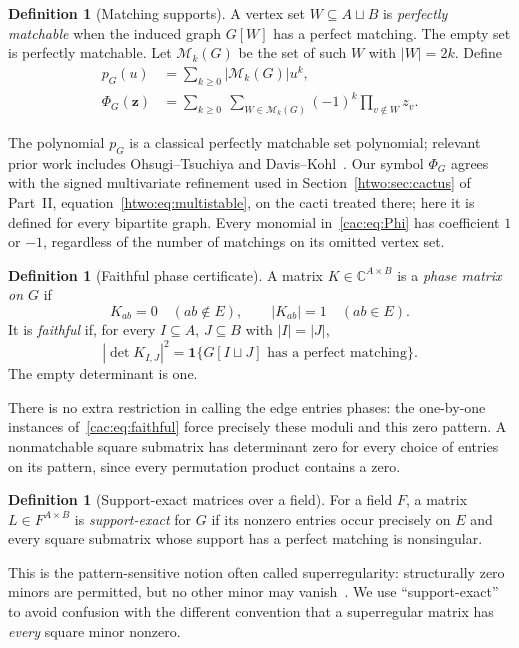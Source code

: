 \documentclass[11pt]{article}
\numberwithin{equation}{section}
\theoremstyle{definition}
\newtheorem{definition}[theorem]{Definition}
\newcommand{\C}{\mathbb C}
\newcommand{\PM}{\mathcal M}
\newcommand{\zv}{\mathbf z}
\newcommand{\normsq}[1]{\left|#1\right|^2}
\begin{document}
\begin{definition}[Matching supports]
A vertex set $W\subseteq A\sqcup B$ is \emph{perfectly matchable} when the induced graph $G[W]$ has a perfect matching. The empty set is perfectly matchable. Let $\PM_k(G)$ be the set of such $W$ with $|W|=2k$. Define
\begin{align}
 p_G(u)&=\sum_{k\geq0}|\PM_k(G)|u^k,\label{cac:eq:p}\\
 \Phi_G(\zv)&=\sum_{k\geq0}\ \sum_{W\in\PM_k(G)}
          (-1)^k\prod_{v\notin W}z_v.\label{cac:eq:Phi}
\end{align}
\end{definition}
The polynomial $p_G$ is a classical perfectly matchable set polynomial; relevant prior work includes Ohsugi--Tsuchiya and Davis--Kohl~\cite{OT21,DK}. Our symbol $\Phi_G$ agrees with the signed multivariate refinement used in Section~\ref{htwo:sec:cactus} of Part~II, equation~\eqref{htwo:eq:multistable}, on the cacti treated there; here it is defined for every bipartite graph. Every monomial in~\eqref{cac:eq:Phi} has coefficient $1$ or $-1$, regardless of the number of matchings on its omitted vertex set.

\begin{definition}[Faithful phase certificate]
A matrix $K\in\C^{A\times B}$ is a \emph{phase matrix on $G$} if
\[
 K_{ab}=0\quad(ab\notin E),\qquad |K_{ab}|=1\quad(ab\in E).
\]
It is \emph{faithful} if, for every $I\subseteq A$, $J\subseteq B$ with $|I|=|J|$,
\begin{equation}
 \normsq{\det K_{I,J}}
 =\mathbf1\{G[I\sqcup J]\text{ has a perfect matching}\}.
 \label{cac:eq:faithful}
\end{equation}
The empty determinant is one.
\end{definition}
There is no extra restriction in calling the edge entries phases: the one-by-one instances of~\eqref{cac:eq:faithful} force precisely these moduli and this zero pattern. A nonmatchable square submatrix has determinant zero for every choice of entries on its pattern, since every permutation product contains a zero.

\begin{definition}[Support-exact matrices over a field]
For a field $F$, a matrix $L\in F^{A\times B}$ is \emph{support-exact} for $G$ if its nonzero entries occur precisely on $E$ and every square submatrix whose support has a perfect matching is nonsingular.
\end{definition}
This is the pattern-sensitive notion often called superregularity: structurally zero minors are permitted, but no other minor may vanish~\cite{ANP}. We use ``support-exact'' to avoid confusion with the different convention that a superregular matrix has \emph{every} square minor nonzero.
\end{document}

